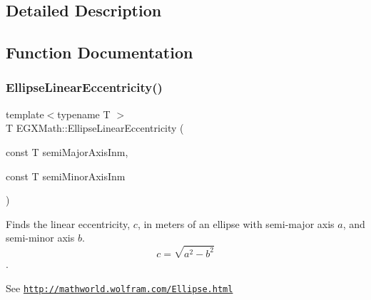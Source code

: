 \subsection{Detailed Description}


\subsection{Function Documentation}
\mbox{\label{group___e_g_x_math-_geometry-2_d-_ellipse-_linear_eccentricity_gac70b3010e30aa8b73deb50fe2b9b9a91}} 
\subsubsection{\texorpdfstring{Ellipse\+Linear\+Eccentricity()}{EllipseLinearEccentricity()}}
{\footnotesize\ttfamily template$<$typename T $>$ \\
T E\+G\+X\+Math\+::\+Ellipse\+Linear\+Eccentricity (\begin{DoxyParamCaption}\item[{const T}]{semi\+Major\+Axis\+Inm,  }\item[{const T}]{semi\+Minor\+Axis\+Inm }\end{DoxyParamCaption})}



Finds the linear eccentricity, $c$, in meters of an ellipse with semi-\/major axis $a$, and semi-\/minor axis $b$. \[ c=\sqrt{a^2-b^2} \]. 

See \href{http://mathworld.wolfram.com/Ellipse.html}{\tt http\+://mathworld.\+wolfram.\+com/\+Ellipse.\+html}


